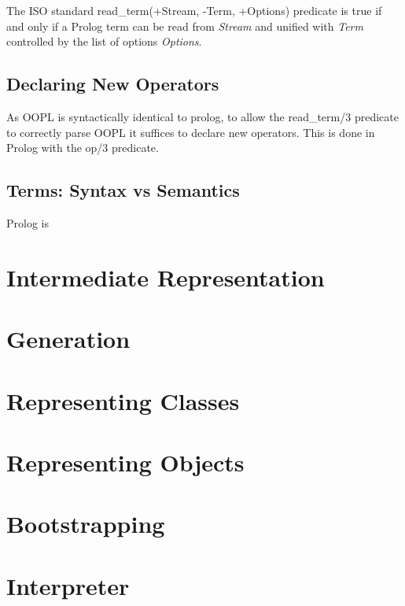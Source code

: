 \documentclass[12pt,a4paper,twoside,openright]{report}
\begin{document}
The ISO standard \cite{ISOPROLOG} read_term(+Stream, -Term, +Options) predicate is true if and only if a Prolog term can be read from \emph{Stream} and unified with \emph{Term} controlled by the list of options \emph{Options}. 

\subsection{Declaring New Operators}

As OOPL is syntactically identical to prolog, to allow the read_term/3 predicate to correctly parse OOPL it suffices to declare new operators. This is done in Prolog with the op/3 predicate. 

\subsection{Terms: Syntax vs Semantics}

Prolog is 

\section{Intermediate Representation}

\section{Generation}


\section{Representing Classes}

\section{Representing Objects}

\section{Bootstrapping}

\section{Interpreter}
\end{document}
